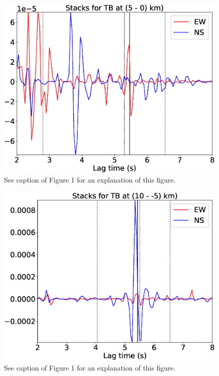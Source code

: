 \documentclass[letterpaper, 12pt]{article}
\begin{document}
\begin{figure}[H]
\includegraphics[width=\linewidth]{figures/intervals/TB_005_000_stacks.eps}
\caption{See caption of Figure 1 for an explanation of this figure.}
\end{figure}

\begin{figure}[H]
\includegraphics[width=\linewidth]{figures/intervals/TB_010_-05_stacks.eps}
\caption{See caption of Figure 1 for an explanation of this figure.}
\end{figure}
\end{document}
